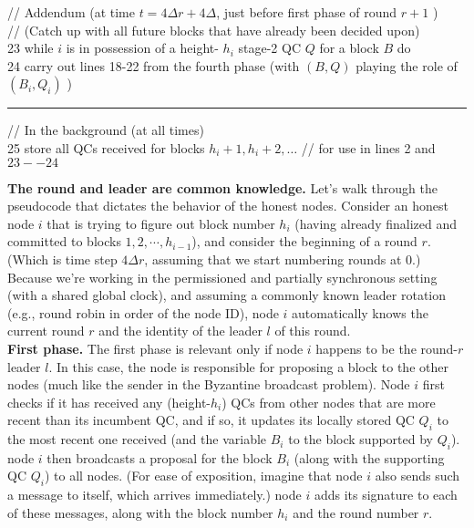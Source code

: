 {// Addendum (at time $t=4 \Delta r+4 \Delta$, just before first phase of round $r+1$ )\\
// (Catch up with all future blocks that have already been decided upon)\\
23\hspace{0.2cm} while $i$ is in possession of a height- $h_i$ stage-2 QC $Q$ for a block $B$ do\\
24\hspace{0.2cm} carry out lines 18-22 from the fourth phase (with $(B, Q)$ playing the role of $\left(B_i, Q_i\right)$ )\\
\hrule

// In the background (at all times)\\
25\hspace{0.2cm} store all QCs received for blocks $h_i+1, h_i+2, \ldots$ \quad \quad \quad \quad // for use in lines 2 and $23--24$}


\noindent
\textbf{The round and leader are common knowledge.} 
Let’s walk through the pseudocode
that dictates the behavior of the honest nodes. Consider an honest node $i$ that is trying to
figure out block number $h_i$ (having already finalized and committed to blocks $1, 2, \cdots , h_{i - 1}$),
and consider the beginning of a round $r$. (Which is time step $4\Delta r$, assuming that we
start numbering rounds at 0.) Because we’re working in the permissioned and partially
synchronous setting (with a shared global clock), and assuming a commonly known leader
rotation (e.g., round robin in order of the node ID), node $i$ automatically knows the current
round $r$ and the identity of the leader $l$ of this round.\\

\noindent
\textbf{First phase.} 
The first phase is relevant only if node $i$ happens to be the round-$r$ leader $l$.
In this case, the node is responsible for proposing a block to the other nodes (much like
the sender in the Byzantine broadcast problem). Node $i$ first checks if it has received any
(height-$h_i$) QCs from other nodes that are more recent than its incumbent QC, and if so, it
updates its locally stored QC $Q_i$ to the most recent one received (and the variable $B_i$ to the
block supported by $Q_i$). node $i$ then broadcasts a proposal for the block $B_i$ (along with the
supporting QC $Q_i$) to all nodes. (For ease of exposition, imagine that node $i$ also sends such
a message to itself, which arrives immediately.) node $i$ adds its signature to each of these
messages, along with the block number $h_i$ and the round number $r$.\\

